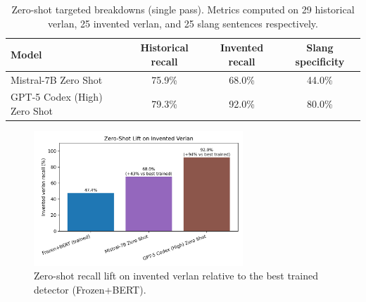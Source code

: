 \documentclass[12pt]{article}
\begin{document}
\begin{table}[H]
    \centering
    \footnotesize
    \begin{tabular}{lccc}
        \hline
        Model & Historical recall & Invented recall & Slang specificity \\
        \hline
        Mistral-7B Zero Shot & 75.9\% & 68.0\% & 44.0\% \\
        GPT-5 Codex (High) Zero Shot & 79.3\% & 92.0\% & 80.0\% \\
        \hline
    \end{tabular}
    \caption{Zero-shot targeted breakdowns (single pass). Metrics computed on 29 historical verlan, 25 invented verlan, and 25 slang sentences respectively.}
    \label{tab:appendix-zeroshot-targeted}
\end{table}

\begin{figure}[H]
    \centering
    \includegraphics[width=0.7\textwidth]{figures/invented_relative_improvement.png}
    \caption{Zero-shot recall lift on invented verlan relative to the best trained detector (Frozen+BERT).}
    \label{fig:invented-lift}
\end{figure}


\end{document}
